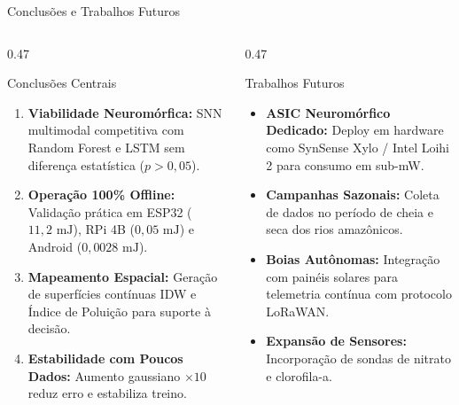 \documentclass[aspectratio=169,10pt]{beamer}
\begin{document}
\begin{frame}{Conclusões e Trabalhos Futuros}
  \begin{columns}[T,onlytextwidth]
    \begin{column}{0.47\linewidth}
      \begin{block}{Conclusões Centrais}
        \footnotesize
        \begin{enumerate}
          \item \textbf{Viabilidade Neuromórfica:} SNN multimodal competitiva com Random Forest e LSTM sem diferença estatística ($p>0{,}05$).
          \item \textbf{Operação 100\% Offline:} Validação prática em ESP32 ($11{,}2\text{ mJ}$), RPi 4B ($0{,}05\text{ mJ}$) e Android ($0{,}0028\text{ mJ}$).
          \item \textbf{Mapeamento Espacial:} Geração de superfícies contínuas IDW e Índice de Poluição para suporte à decisão.
          \item \textbf{Estabilidade com Poucos Dados:} Aumento gaussiano $\times 10$ reduz erro e estabiliza treino.
        \end{enumerate}
      \end{block}
    \end{column}
    \hfill
    \begin{column}{0.47\linewidth}
      \begin{exampleblock}{Trabalhos Futuros}
        \footnotesize
        \begin{itemize}
          \item \textbf{ASIC Neuromórfico Dedicado:} Deploy em hardware como SynSense Xylo / Intel Loihi 2 para consumo em sub-mW.
          \item \textbf{Campanhas Sazonais:} Coleta de dados no período de cheia e seca dos rios amazônicos.
          \item \textbf{Boias Autônomas:} Integração com painéis solares para telemetria contínua com protocolo LoRaWAN.
          \item \textbf{Expansão de Sensores:} Incorporação de sondas de nitrato e clorofila-a.
        \end{itemize}
      \end{exampleblock}
    \end{column}
  \end{columns}
\end{frame}
\end{document}
